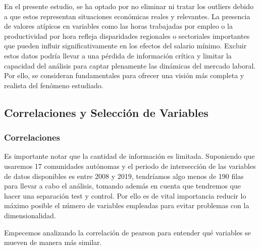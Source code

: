 \documentclass[11pt]{article}
\begin{document}
    En el presente estudio, se ha optado por no eliminar ni tratar los
outliers debido a que estos representan situaciones económicas reales y
relevantes. La presencia de valores atípicos en variables como las horas
trabajadas por empleo o la productividad por hora refleja disparidades
regionales o sectoriales importantes que pueden influir
significativamente en los efectos del salario mínimo. Excluir estos
datos podría llevar a una pérdida de información crítica y limitar la
capacidad del análisis para captar plenamente las dinámicas del mercado
laboral. Por ello, se consideran fundamentales para ofrecer una visión
más completa y realista del fenómeno estudiado.

    \subsection{Correlaciones y Selección de
Variables}\label{correlaciones-y-selecciuxf3n-de-variables}

    \subsubsection{Correlaciones}\label{correlaciones}

    Es importante notar que la cantidad de información es limitada.
Suponiendo que usaremos 17 comunidades autónomas y el periodo de
intersección de las variables de datos disponibles es entre 2008 y 2019,
tendríamos algo menos de 190 filas para llevar a cabo el análisis,
tomando además en cuenta que tendremos que hacer una separación test y
control. Por ello es de vital importancia reducir lo máximo posible el
número de variables empleadas para evitar problemas con la
dimensionalidad.

Empecemos analizando la correlación de pearson para entender qué
variables se mueven de manera más similar.
\end{document}
